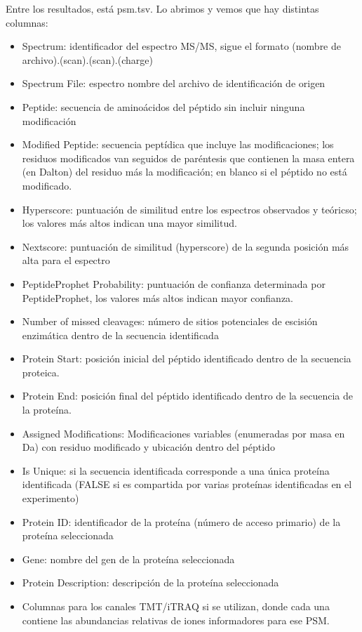 \documentclass[nochap]{config/ejercicios}
\begin{document}
Entre los resultados, está psm.tsv. Lo abrimos y vemos que hay distintas columnas:
\begin{itemize}
\item Spectrum: identificador del espectro MS/MS, sigue el formato (nombre de archivo).(scan).(scan).(charge)
\item Spectrum File: espectro nombre del archivo de identificación de origen
\item Peptide: secuencia de aminoácidos del péptido sin incluir ninguna modificación
\item Modified Peptide: secuencia peptídica que incluye las modificaciones; los residuos modificados van seguidos de paréntesis que contienen la masa entera (en Dalton) del residuo más la modificación; en blanco si el péptido no está modificado.
\item Hyperscore: puntuación de similitud entre los espectros observados y teóricso; los valores más altos indican una mayor similitud.
\item Nextscore: puntuación de similitud (hyperscore) de la segunda posición más alta para el espectro
\item PeptideProphet Probability: puntuación de confianza determinada por PeptideProphet, los valores más altos indican mayor confianza.
\item Number of missed cleavages: número de sitios potenciales de escisión enzimática dentro de la secuencia identificada
\item Protein Start: posición inicial del péptido identificado dentro de la secuencia proteica.
\item Protein End: posición final del péptido identificado dentro de la secuencia de la proteína.
\item Assigned Modifications: Modificaciones variables (enumeradas por masa en Da) con residuo modificado y ubicación dentro del péptido
\item Is Unique: si la secuencia identificada corresponde a una única proteína identificada (FALSE si es compartida por varias proteínas identificadas en el experimento)
\item Protein ID: identificador de la proteína (número de acceso primario) de la proteína seleccionada
\item Gene: nombre del gen de la proteína seleccionada
\item Protein Description: descripción de la proteína seleccionada
\item Columnas para los canales TMT/iTRAQ si se utilizan, donde cada una contiene las abundancias relativas de iones informadores para ese PSM.
\end{itemize}
\end{document}
